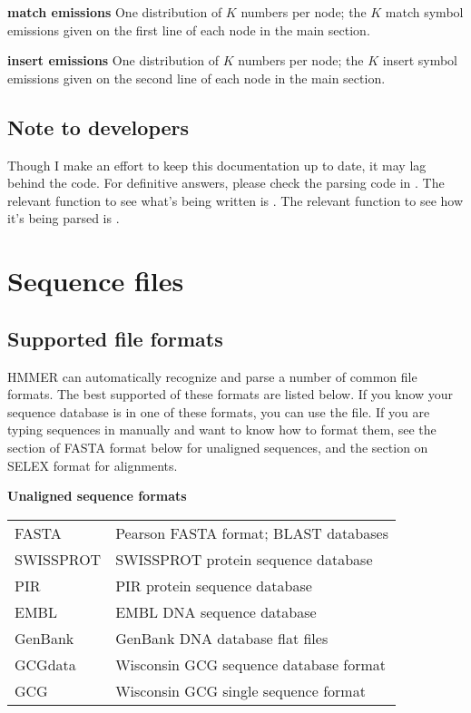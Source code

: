 \begin{wideitem}
\item [\textbf{match emissions}] One distribution of $K$ numbers
per node; the $K$ match symbol emissions given on the first line of
each node in the main section.

\item [\textbf{insert emissions}] One distribution of $K$ numbers
per node; the $K$ insert symbol emissions given on the second line of
each node in the main section.

\end{wideitem}

\subsection{Note to developers}

Though I make an effort to keep this documentation up to date, it may
lag behind the code. For definitive answers, please check the parsing
code in . The relevant function to see what's being
written is . The relevant function to see how it's
being parsed is .


\section {Sequence files}

\subsection{Supported file formats}
 
HMMER can automatically recognize and parse a number of common file
formats. The best supported of these formats are listed below. If you
know your sequence database is in one of these formats, you can use
the file.  If you are typing sequences in manually and want to know
how to format them, see the section of FASTA format below for
unaligned sequences, and the section on SELEX format for alignments.

\textbf{Unaligned sequence formats}
\begin{tabular}{ll}
FASTA     & Pearson FASTA format; BLAST databases \\
SWISSPROT & SWISSPROT protein sequence database\\ 
PIR       & PIR protein sequence database \\
EMBL      & EMBL DNA sequence database \\
GenBank   & GenBank DNA database flat files\\
GCGdata   & Wisconsin GCG sequence database format \\
GCG       & Wisconsin GCG single sequence format \\
\end{tabular}


